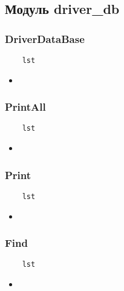\subsection{Модуль driver\_db}

\subsubsection{DriverDataBase}

\begin{lstlisting}
    lst
\end{lstlisting}

\begin{itemize}
    \item \verb||
\end{itemize}

\subsubsection{PrintAll}

\begin{lstlisting}
    lst
\end{lstlisting}

\begin{itemize}
    \item \verb||
\end{itemize}

\subsubsection{Print}

\begin{lstlisting}
    lst
\end{lstlisting}

\begin{itemize}
    \item \verb||
\end{itemize}

\subsubsection{Find}

\begin{lstlisting}
    lst
\end{lstlisting}

\begin{itemize}
    \item \verb||
\end{itemize}

